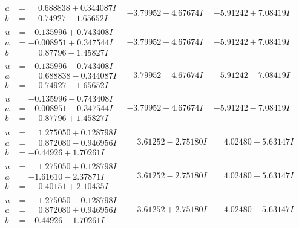 \documentclass[1p]{elsarticle_modified}
\theoremstyle{definition}
\begin{document}
$$\begin{array}{c|c|c}
\begin{aligned}
a &= \phantom{-}0.688838 + 0.344087 I \\
b &= \phantom{-}0.74927 + 1.65652 I\end{aligned}
 & -3.79952 - 4.67674 I & -5.91242 + 7.08419 I \\ \hline\begin{aligned}
u &= -0.135996 + 0.743408 I \\
a &= -0.008951 + 0.347544 I \\
b &= \phantom{-}0.87796 - 1.45827 I\end{aligned}
 & -3.79952 - 4.67674 I & -5.91242 + 7.08419 I \\ \hline\begin{aligned}
u &= -0.135996 - 0.743408 I \\
a &= \phantom{-}0.688838 - 0.344087 I \\
b &= \phantom{-}0.74927 - 1.65652 I\end{aligned}
 & -3.79952 + 4.67674 I & -5.91242 - 7.08419 I \\ \hline\begin{aligned}
u &= -0.135996 - 0.743408 I \\
a &= -0.008951 - 0.347544 I \\
b &= \phantom{-}0.87796 + 1.45827 I\end{aligned}
 & -3.79952 + 4.67674 I & -5.91242 - 7.08419 I \\ \hline\begin{aligned}
u &= \phantom{-}1.275050 + 0.128798 I \\
a &= \phantom{-}0.872080 - 0.946956 I \\
b &= -0.44926 + 1.70261 I\end{aligned}
 & \phantom{-}3.61252 - 2.75180 I & \phantom{-}4.02480 + 5.63147 I \\ \hline\begin{aligned}
u &= \phantom{-}1.275050 + 0.128798 I \\
a &= -1.61610 - 2.37871 I \\
b &= \phantom{-}0.40151 + 2.10435 I\end{aligned}
 & \phantom{-}3.61252 - 2.75180 I & \phantom{-}4.02480 + 5.63147 I \\ \hline\begin{aligned}
u &= \phantom{-}1.275050 - 0.128798 I \\
a &= \phantom{-}0.872080 + 0.946956 I \\
b &= -0.44926 - 1.70261 I\end{aligned}
 & \phantom{-}3.61252 + 2.75180 I & \phantom{-}4.02480 - 5.63147 I \\ \hline\begin{aligned}

\end{aligned}
\end{array}$$
\end{document}
